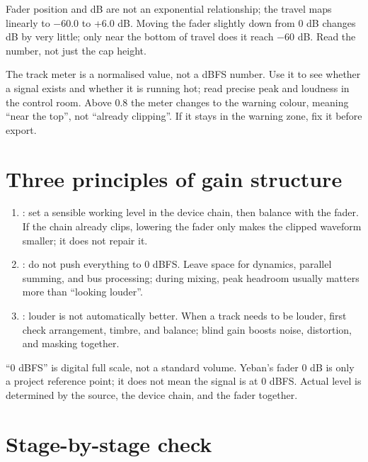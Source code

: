 Fader position and dB are not an exponential relationship; the travel maps
linearly to −60.0 to +6.0 dB. Moving the fader slightly down from 0 dB changes dB
by very little; only near the bottom of travel does it reach −60 dB. Read the
number, not just the cap height.

The track meter is a normalised value, not a dBFS number. Use it to see whether a
signal exists and whether it is running hot; read precise peak and loudness in the
control room. Above 0.8 the meter changes to the warning colour, meaning ``near
the top'', not ``already clipping''. If it stays in the warning zone, fix it
before export.

\section{Three principles of gain structure}

\begin{enumerate}
  \item {}: set a sensible working level in the device
        chain, then balance with the fader. If the chain already clips, lowering the
        fader only makes the clipped waveform smaller; it does not repair it.
  \item {}: do not push everything to 0 dBFS.
        Leave space for dynamics, parallel summing, and bus processing; during
        mixing, peak headroom usually matters more than ``looking louder''.
  \item {}: louder is not automatically better. When a
        track needs to be louder, first check arrangement, timbre, and balance;
        blind gain boosts noise, distortion, and masking together.
\end{enumerate}

``0 dBFS'' is digital full scale, not a standard volume. Yeban's fader 0 dB is
only a project reference point; it does not mean the signal is at 0 dBFS. Actual
level is determined by the source, the device chain, and the fader together.

\section{Stage-by-stage check}

